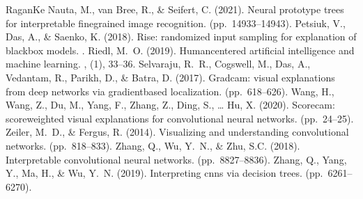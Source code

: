 \documentclass[letterpaper,10pt,english]{sphinxmanual}
\begin{document}
\begin{sphinxthebibliography}{Ragan\sphinxhyphen{}Ke}
\sphinxAtStartPar
Nauta, M., van Bree, R., \& Seifert, C. (2021). Neural prototype trees for interpretable fine\sphinxhyphen{}grained image recognition.  (pp. 14933–14943).
\sphinxAtStartPar
Petsiuk, V., Das, A., \& Saenko, K. (2018). Rise: randomized input sampling for explanation of black\sphinxhyphen{}box models. .
\sphinxAtStartPar
Riedl, M. O. (2019). Human\sphinxhyphen{}centered artificial intelligence and machine learning. , (1), 33–36.
\sphinxAtStartPar
Selvaraju, R. R., Cogswell, M., Das, A., Vedantam, R., Parikh, D., \& Batra, D. (2017). Grad\sphinxhyphen{}cam: visual explanations from deep networks via gradient\sphinxhyphen{}based localization.  (pp. 618–626).
\sphinxAtStartPar
Wang, H., Wang, Z., Du, M., Yang, F., Zhang, Z., Ding, S., … Hu, X. (2020). Score\sphinxhyphen{}cam: score\sphinxhyphen{}weighted visual explanations for convolutional neural networks.  (pp. 24–25).
\sphinxAtStartPar
Zeiler, M. D., \& Fergus, R. (2014). Visualizing and understanding convolutional networks.  (pp. 818–833).
\sphinxAtStartPar
Zhang, Q., Wu, Y. N., \& Zhu, S.\sphinxhyphen{}C. (2018). Interpretable convolutional neural networks.  (pp. 8827–8836).
\sphinxAtStartPar
Zhang, Q., Yang, Y., Ma, H., \& Wu, Y. N. (2019). Interpreting cnns via decision trees.  (pp. 6261–6270).

\end{sphinxthebibliography}
\end{document}
